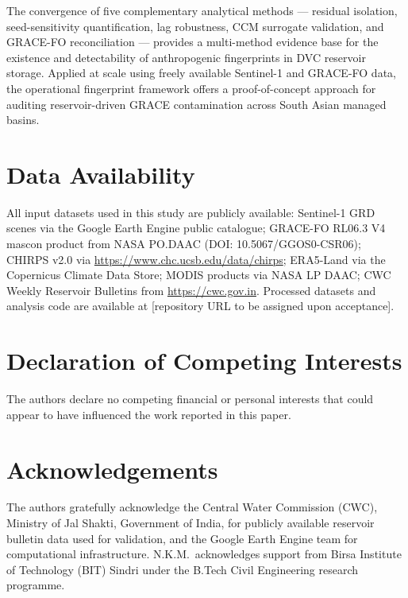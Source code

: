 \documentclass[preprint,12pt,authoryear]{elsarticle}
\begin{document}
The convergence of five complementary analytical methods --- residual isolation,
seed-sensitivity quantification, lag robustness, CCM surrogate validation, and
GRACE-FO reconciliation --- provides a multi-method evidence base for
the existence and detectability of anthropogenic fingerprints in DVC reservoir
storage. Applied at scale using freely available Sentinel-1 and GRACE-FO data,
the operational fingerprint framework offers a proof-of-concept approach for auditing
reservoir-driven GRACE contamination across South Asian managed basins.

\section*{Data Availability}

All input datasets used in this study are publicly available:
Sentinel-1 GRD scenes via the Google Earth Engine public catalogue;
GRACE-FO RL06.3 V4 mascon product from NASA PO.DAAC (DOI: 10.5067/GGOS0-CSR06);
CHIRPS v2.0 via \url{https://www.chc.ucsb.edu/data/chirps};
ERA5-Land via the Copernicus Climate Data Store;
MODIS products via NASA LP DAAC;
CWC Weekly Reservoir Bulletins from \url{https://cwc.gov.in}.
Processed datasets and analysis code are available at [repository URL to be
assigned upon acceptance].

\section*{Declaration of Competing Interests}

The authors declare no competing financial or personal interests that could
appear to have influenced the work reported in this paper.

\section*{Acknowledgements}

The authors gratefully acknowledge the Central Water Commission (CWC),
Ministry of Jal Shakti, Government of India, for publicly available reservoir
bulletin data used for validation, and the Google Earth Engine team for
computational infrastructure. N.K.M.\ acknowledges support from Birsa
Institute of Technology (BIT) Sindri under the B.Tech Civil Engineering
research programme.
\end{document}
